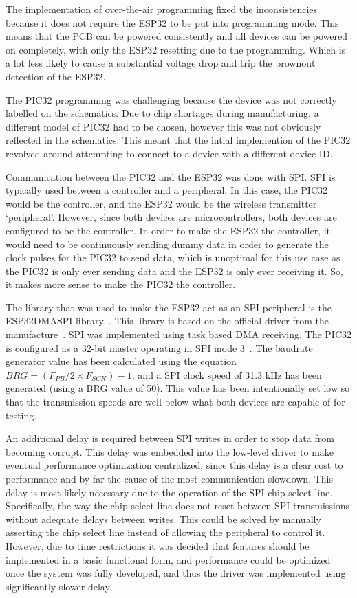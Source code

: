 The implementation of over-the-air programming fixed the inconsistencies because it does not require the ESP32 to be put into programming mode.
This means that the PCB can be powered consistently and all devices can be powered on completely, with only the ESP32 resetting due to the programming.
Which is a lot less likely to cause a substantial voltage drop and trip the brownout detection of the ESP32.

The PIC32 programming was challenging because the device was not correctly labelled on the schematics.
Due to chip shortages during manufacturing, a different model of PIC32 had to be chosen, however this was not obviously reflected in the schematics.
This meant that the intial implemention of the PIC32 revolved around attempting to connect to a device with a different device ID.

Communication between the PIC32 and the ESP32 was done with SPI.
SPI is typically used between a controller and a peripheral.
In this case, the PIC32 would be the controller, and the ESP32 would be the wireless transmitter `peripheral'.
However, since both devices are microcontrollers, both devices are configured to be the controller.
In order to make the ESP32 the controller,
it would need to be continuously sending dummy data in order to generate the clock pulses for the PIC32 to send data,
which is unoptimal for this use case as the PIC32 is only ever sending data and the ESP32 is only ever receiving it.
So, it makes more sense to make the PIC32 the controller.

The library that was used to make the ESP32 act as an SPI peripheral is the ESP32DMASPI library~\cite{ESP32DMASPI}.
This library is based on the official driver from the manufacture~\cite{SPI}.
SPI was implemented using task based DMA receiving.
The PIC32 is configured as a 32-bit master operating in SPI mode 3~\cite{Barry:2012}.
The baudrate generator value has been calculated using the equation \(BRG = (F_{PB} / 2 \times F_{SCK}) - 1\),
and a SPI clock speed of 31.3 kHz has been generated (using a BRG value of 50).
This value has been intentionally set low so that the transmission speeds are well below what both devices are capable of for testing.

An additional delay is required between SPI writes in order to stop data from becoming corrupt.
This delay was embedded into the low-level driver to make eventual performance optimization centralized,
since this delay is a clear cost to performance and by far the cause of the most communication slowdown.
This delay is most likely necessary due to the operation of the SPI chip select line.
Specifically, the way the chip select line does not reset between SPI transmissions without adequate delays between writes.
This could be solved by manually asserting the chip select line instead of allowing the peripheral to control it.
However, due to time restrictions it was decided that features should be implemented in a basic functional form,
and performance could be optimized once the system was fully developed,
and thus the driver was implemented using significantly slower delay.\\\\

